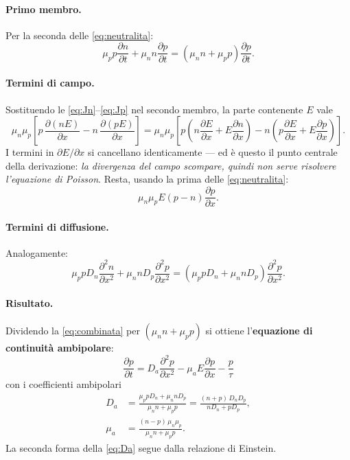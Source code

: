 \documentclass[11pt,a4paper]{article}
\newcommand{\dpar}[2]{\frac{\partial #1}{\partial #2}}
\newcommand{\dparq}[2]{\frac{\partial^2 #1}{\partial #2^2}}
\begin{document}
\paragraph{Primo membro.} Per la seconda delle \eqref{eq:neutralita}:
\begin{equation}
  \mu_p p \dpar{n}{t} + \mu_n n \dpar{p}{t} = (\mu_n n + \mu_p p)\dpar{p}{t}.
\end{equation}

\paragraph{Termini di campo.} Sostituendo le \eqref{eq:Jn}--\eqref{eq:Jp} nel secondo
membro, la parte contenente $E$ vale
\begin{equation}
  \mu_n\mu_p \left[ p\,\dpar{(nE)}{x} - n\,\dpar{(pE)}{x} \right]
  = \mu_n\mu_p \left[ p\!\left(n\dpar{E}{x} + E\dpar{n}{x}\right)
                    - n\!\left(p\dpar{E}{x} + E\dpar{p}{x}\right) \right].
\end{equation}
I termini in $\partial E/\partial x$ si cancellano identicamente --- ed \`e questo il
punto centrale della derivazione: \emph{la divergenza del campo scompare, quindi non
serve risolvere l'equazione di Poisson}. Resta, usando la prima delle
\eqref{eq:neutralita}:
\begin{equation}
  \mu_n\mu_p E \left( p - n \right) \dpar{p}{x}.
\end{equation}

\paragraph{Termini di diffusione.} Analogamente:
\begin{equation}
  \mu_p p D_n \dparq{n}{x} + \mu_n n D_p \dparq{p}{x}
  = \left( \mu_p p D_n + \mu_n n D_p \right) \dparq{p}{x}.
\end{equation}

\paragraph{Risultato.} Dividendo la \eqref{eq:combinata} per $(\mu_n n + \mu_p p)$ si
ottiene l'\textbf{equazione di continuit\`a ambipolare}:
\begin{equation}
  \boxed{\;
  \dpar{p}{t} = D_a \dparq{p}{x} - \mu_a E \dpar{p}{x} - \frac{p}{\tau}
  \;}
  \label{eq:ambipolare}
\end{equation}
con i coefficienti ambipolari
\begin{align}
  D_a &= \frac{\mu_p p D_n + \mu_n n D_p}{\mu_n n + \mu_p p}
       = \frac{(n+p)\,D_n D_p}{n D_n + p D_p}, \label{eq:Da}\\[4pt]
  \mu_a &= \frac{(n-p)\,\mu_n \mu_p}{\mu_n n + \mu_p p}. \label{eq:mua}
\end{align}
La seconda forma della \eqref{eq:Da} segue dalla relazione di Einstein.
\end{document}
